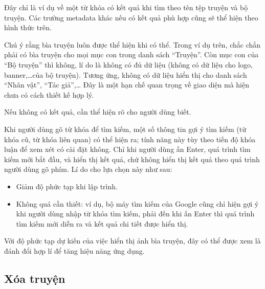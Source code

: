 \documentclass[../../thesis]{subfiles}
\begin{document}
Đây chỉ là ví dụ về một từ khóa có kết quả khi tìm theo tên tệp truyện và bộ
truyện. Các trường metadata khác nếu có kết quả phù hợp cũng sẽ thể hiện theo
hình thức trên.

Chú ý rằng bìa truyện luôn được thể hiện khi có thể. Trong ví dụ trên, chắc chắn
phải có bìa truyện cho mọi mục con trong danh sách ``Truyện''. Còn mục con của
``Bộ truyện'' thì không, lí do là không có đủ dữ liệu (không có dữ liệu cho
logo, banner,\ldots của bộ truyện). Tương ứng, không có dữ liệu hiển thị cho
danh sách ``Nhân vật'', ``Tác giả'',\ldots{} Đây là một hạn chế quan trọng về
giao diện mà hiện chưa có cách thiết kế hợp lý.

Nếu không có kết quả, cần thể hiện rõ cho người dùng biết.

Khi người dùng gõ từ khóa để tìm kiếm, một số thông tin gợi ý tìm kiếm (từ khóa
cũ, từ khóa liên quan) có thể hiện ra; tính năng này tùy theo tiến độ khóa luận
để xem xét có cài đặt không. Chỉ khi người dùng ấn Enter, quá trình tìm kiếm mới
bắt đầu, và hiển thị kết quả, chứ không hiển thị kết quả theo quá trình người
dùng gõ phím. Lí do cho lựa chọn này như sau:

\begin{itemize}
    \item
        Giảm độ phức tạp khi lập trình.
    \item
        Không quá cần thiết: ví dụ, bộ máy tìm kiếm của Google cũng chỉ hiện gợi
        ý khi người dùng nhập từ khóa tìm kiếm, phải đến khi ấn Enter thì quá
        trình tìm kiếm mới diễn ra và kết quả chi tiết được hiển thị.
\end{itemize}

Với độ phức tạp dự kiến của việc hiển thị ảnh bìa truyện, đây có thể được xem là
đánh đổi hợp lí để tăng hiệu năng ứng dụng.

\subsection{Xóa truyện}\label{sec:delete-comic}
\end{document}
